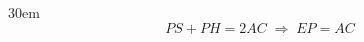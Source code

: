 \documentclass[border=4pt]{standalone}
\begin{document}
\begin{varwidth}{30em}
\large
\[ PS + PH = 2AC \;\Rightarrow\; EP = AC \]

\end{varwidth}
\end{document}
